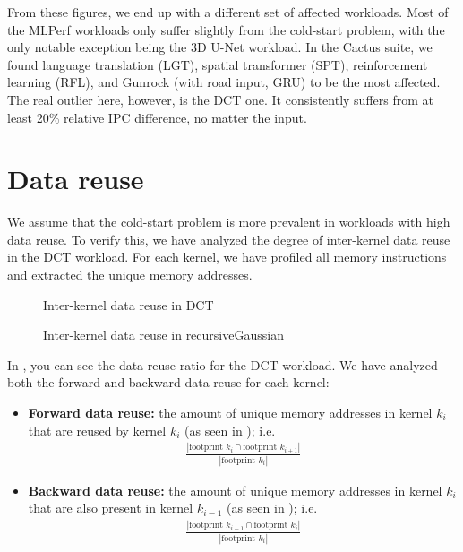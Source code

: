 From these figures, we end up with a different set of affected workloads.
Most of the MLPerf workloads only suffer slightly from the cold-start problem, with the only notable exception being the 3D U-Net workload.
In the Cactus suite, we found language translation (LGT), spatial transformer (SPT), reinforcement learning (RFL), and Gunrock (with road input, GRU) to be the most affected.
The real outlier here, however, is the DCT one.
It consistently suffers from at least 20\% relative IPC difference, no matter the input.

\FloatBarrier

\section{Data reuse}\label{sec:data-reuse}
We assume that the cold-start problem is more prevalent in workloads with high data reuse.
To verify this, we have analyzed the degree of inter-kernel data reuse in the DCT workload.
For each kernel, we have profiled all memory instructions and extracted the unique memory addresses.

\begin{figure}[htb]
    \centering
    \caption{Inter-kernel data reuse in DCT}
    \label{fig:dct_reuse}
\end{figure}

\begin{figure}[hbt]
    \centering
    \caption{Inter-kernel data reuse in recursiveGaussian}
    \label{fig:recg_reuse}
\end{figure}

In , you can see the data reuse ratio for the DCT workload.
We have analyzed both the forward and backward data reuse for each kernel:
\begin{itemize}
    \item \textbf{Forward data reuse:} the amount of unique memory addresses in kernel $k_{i}$ that are reused by kernel $k_{i}$ (as seen in ); i.e.
    \begin{align}
        \frac{|\text{footprint } k_{i} \cap \text{footprint } k_{i+1}|}{|\text{footprint } k_{i}|}
    \end{align}
    \item \textbf{Backward data reuse:} the amount of unique memory addresses in kernel $k_{i}$ that are also present in kernel $k_{i-1}$ (as seen in ); i.e.
    \begin{align}
        \frac{|\text{footprint } k_{i-1} \cap \text{footprint } k_i|}{|\text{footprint } k_i|}
    \end{align}
\end{itemize}

